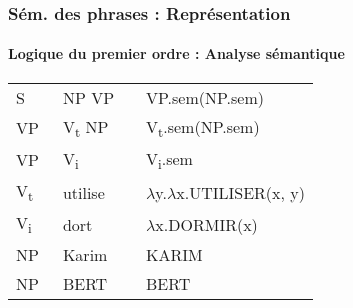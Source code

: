 \documentclass[xcolor=table]{beamer}
\begin{document}
\begin{frame}
	\frametitle{Sém. des phrases : Représentation}
	\framesubtitle{Logique du premier ordre : Analyse sémantique}
	


\begin{center}
	\small\bfseries
	\begin{tabular}{llll}
		\hline\hline
		S  & \textrightarrow\ NP VP && VP.sem(NP.sem) \\
		VP & \textrightarrow\ V\textsubscript{t} NP && V\textsubscript{t}.sem(NP.sem)\\
		VP & \textrightarrow\ V\textsubscript{i} && V\textsubscript{i}.sem \\
		V\textsubscript{t}  & \textrightarrow\ utilise && $ \lambda $y.$ \lambda $x.UTILISER(x, y) \\
		V\textsubscript{i}  & \textrightarrow\ dort && $ \lambda $x.DORMIR(x) \\
		NP  & \textrightarrow\  Karim && KARIM \\
		NP  & \textrightarrow\  BERT && BERT \\
		\hline\hline
		\end{tabular}
	
\end{center}
	

\end{frame}
\end{document}
